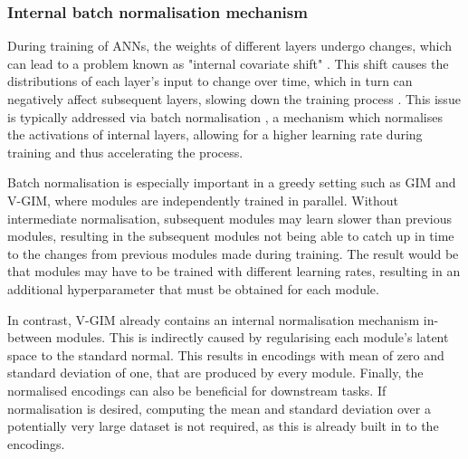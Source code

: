 
	
	\subsubsection{Internal batch normalisation mechanism}
		During training of ANNs, the weights of different layers undergo changes, which can lead to a problem known as "internal covariate shift" \cite{ioffeBatchNormalizationAccelerating2015}. This shift causes the distributions of each layer's input to change over time, which in turn can negatively affect subsequent layers, slowing down the training process \cite{bjorckUnderstandingBatchNormalization2018, lecunEfficientBackProp1998}. This issue is typically addressed via batch normalisation \cite{santurkarHowDoesBatch2018, bjorckUnderstandingBatchNormalization2018}, a mechanism which normalises the activations of internal layers, allowing for a higher learning rate during training and thus accelerating the process.
			
		Batch normalisation is especially important in a greedy setting such as GIM and V-GIM, where modules are independently trained in parallel. Without intermediate normalisation, subsequent modules may learn slower than previous modules, resulting in the subsequent modules not being able to catch up in time to the changes from previous modules made during training. The result would be that modules may have to be trained with different learning rates, resulting in an additional hyperparameter that must be obtained for each module.
		
		In contrast, V-GIM already contains an internal normalisation mechanism in-between modules. This is indirectly caused by regularising each module's latent space to the standard normal. This results in encodings with mean of zero and standard deviation of one, that are produced by every module. Finally, the normalised encodings can also be beneficial for downstream tasks. If normalisation is desired, computing the mean and standard deviation over a potentially very large dataset is not required, as this is already built in to the encodings.

